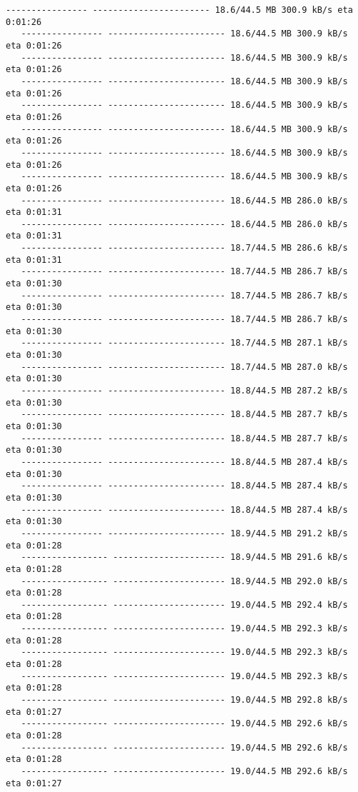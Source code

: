 \documentclass[11pt]{article}
\begin{document}
\begin{Verbatim}[commandchars=\\\{\}]
   ---------------- ----------------------- 18.6/44.5 MB 300.9 kB/s eta 0:01:26
   ---------------- ----------------------- 18.6/44.5 MB 300.9 kB/s eta 0:01:26
   ---------------- ----------------------- 18.6/44.5 MB 300.9 kB/s eta 0:01:26
   ---------------- ----------------------- 18.6/44.5 MB 300.9 kB/s eta 0:01:26
   ---------------- ----------------------- 18.6/44.5 MB 300.9 kB/s eta 0:01:26
   ---------------- ----------------------- 18.6/44.5 MB 300.9 kB/s eta 0:01:26
   ---------------- ----------------------- 18.6/44.5 MB 300.9 kB/s eta 0:01:26
   ---------------- ----------------------- 18.6/44.5 MB 300.9 kB/s eta 0:01:26
   ---------------- ----------------------- 18.6/44.5 MB 286.0 kB/s eta 0:01:31
   ---------------- ----------------------- 18.6/44.5 MB 286.0 kB/s eta 0:01:31
   ---------------- ----------------------- 18.7/44.5 MB 286.6 kB/s eta 0:01:31
   ---------------- ----------------------- 18.7/44.5 MB 286.7 kB/s eta 0:01:30
   ---------------- ----------------------- 18.7/44.5 MB 286.7 kB/s eta 0:01:30
   ---------------- ----------------------- 18.7/44.5 MB 286.7 kB/s eta 0:01:30
   ---------------- ----------------------- 18.7/44.5 MB 287.1 kB/s eta 0:01:30
   ---------------- ----------------------- 18.7/44.5 MB 287.0 kB/s eta 0:01:30
   ---------------- ----------------------- 18.8/44.5 MB 287.2 kB/s eta 0:01:30
   ---------------- ----------------------- 18.8/44.5 MB 287.7 kB/s eta 0:01:30
   ---------------- ----------------------- 18.8/44.5 MB 287.7 kB/s eta 0:01:30
   ---------------- ----------------------- 18.8/44.5 MB 287.4 kB/s eta 0:01:30
   ---------------- ----------------------- 18.8/44.5 MB 287.4 kB/s eta 0:01:30
   ---------------- ----------------------- 18.8/44.5 MB 287.4 kB/s eta 0:01:30
   ---------------- ----------------------- 18.9/44.5 MB 291.2 kB/s eta 0:01:28
   ----------------- ---------------------- 18.9/44.5 MB 291.6 kB/s eta 0:01:28
   ----------------- ---------------------- 18.9/44.5 MB 292.0 kB/s eta 0:01:28
   ----------------- ---------------------- 19.0/44.5 MB 292.4 kB/s eta 0:01:28
   ----------------- ---------------------- 19.0/44.5 MB 292.3 kB/s eta 0:01:28
   ----------------- ---------------------- 19.0/44.5 MB 292.3 kB/s eta 0:01:28
   ----------------- ---------------------- 19.0/44.5 MB 292.3 kB/s eta 0:01:28
   ----------------- ---------------------- 19.0/44.5 MB 292.8 kB/s eta 0:01:27
   ----------------- ---------------------- 19.0/44.5 MB 292.6 kB/s eta 0:01:28
   ----------------- ---------------------- 19.0/44.5 MB 292.6 kB/s eta 0:01:28
   ----------------- ---------------------- 19.0/44.5 MB 292.6 kB/s eta 0:01:27

\end{Verbatim}
\end{document}
